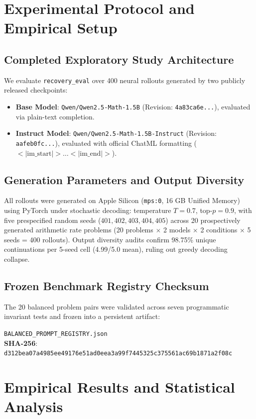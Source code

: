 \documentclass[conference]{IEEEtran}
\begin{document}
\section{Experimental Protocol and Empirical Setup}

\subsection{Completed Exploratory Study Architecture}
We evaluate \texttt{recovery\_eval} over 400 neural rollouts generated by two publicly released checkpoints:
\begin{itemize}
    \item \textbf{Base Model}: \texttt{Qwen/Qwen2.5-Math-1.5B} (Revision: \texttt{4a83ca6e...}), evaluated via plain-text completion.
    \item \textbf{Instruct Model}: \texttt{Qwen/Qwen2.5-Math-1.5B-Instruct} (Revision: \texttt{aafeb0fc...}), evaluated with official ChatML formatting ($<|\text{im\_start}|>\dots<|\text{im\_end}|>$).
\end{itemize}

\subsection{Generation Parameters and Output Diversity}
All rollouts were generated on Apple Silicon (\texttt{mps:0}, 16 GB Unified Memory) using PyTorch under stochastic decoding: temperature $T=0.7$, top-$p=0.9$, with five prespecified random seeds ($401, 402, 403, 404, 405$) across 20 prospectively generated arithmetic rate problems (20 problems $\times$ 2 models $\times$ 2 conditions $\times$ 5 seeds = 400 rollouts). Output diversity audits confirm 98.75\% unique continuations per 5-seed cell (4.99/5.0 mean), ruling out greedy decoding collapse.

\subsection{Frozen Benchmark Registry Checksum}
The 20 balanced problem pairs were validated across seven programmatic invariant tests and frozen into a persistent artifact:
\begin{center}
\small
\texttt{BALANCED\_PROMPT\_REGISTRY.json} \\
\textbf{SHA-256}: \texttt{d312bea07a4985ee49176e51ad0eea3a99f7445325c375561ac69b1871a2f08c}
\end{center}

\section{Empirical Results and Statistical Analysis}
\end{document}
